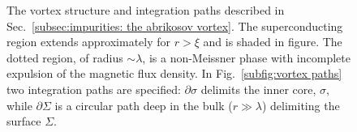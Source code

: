 \begin{figure}
    \centering
    \caption{The vortex structure and integration paths described in Sec.~\ref{subsec:impurities: the abrikosov vortex}. The superconducting region extends approximately for $r>\xi$ and is shaded in figure. The dotted region, of radius $\sim \lambda$, is a non-Meissner phase with incomplete expulsion of the magnetic flux density. In Fig.~\ref{subfig:vortex paths} two integration paths are specified: $\partial\sigma$ delimits the inner core, $\sigma$, while $\partial\Sigma$ is a circular path deep in the bulk ($r\gg\lambda$) delimiting the surface $\Sigma$.}
    \label{fig:vortex}
\end{figure}

